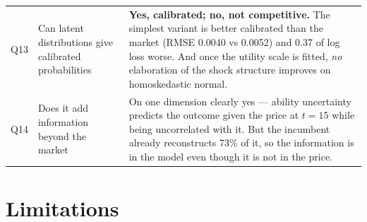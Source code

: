 \documentclass[11pt,a4paper]{article}
\begin{document}
\begin{longtable}{@{}p{}p{}p{}@{}}
Q13 & Can latent distributions give calibrated probabilities & \textbf{Yes, calibrated; no, not competitive.} The simplest variant is better calibrated than the market (RMSE 0.0040 vs 0.0052) and 0.37 of log loss worse. And once the utility scale is fitted, \emph{no} elaboration of the shock structure improves on homoskedastic normal.\\[3pt]
Q14 & Does it add information beyond the market & On one dimension clearly yes --- ability uncertainty predicts the outcome given the price at $t=15$ while being uncorrelated with it. But the incumbent already reconstructs 73\% of it, so the information is in the model even though it is not in the price.\\
\bottomrule
\end{longtable}

\newpage
\section{Limitations}\label{sec:limitations}
\end{document}

